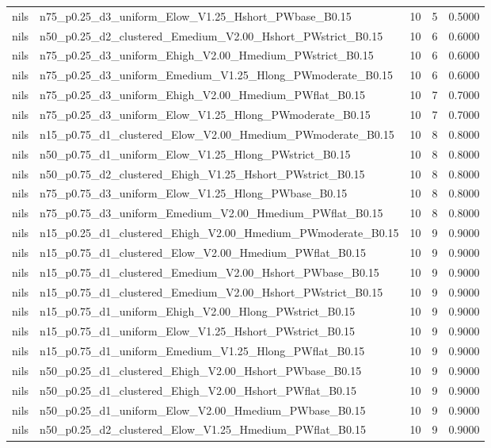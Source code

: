 \begin{tabular}{llrrr}
nils & n75_p0.25_d3_uniform_Elow_V1.25_Hshort_PWbase_B0.15 & 10 & 5 & 0.5000 \\
nils & n50_p0.25_d2_clustered_Emedium_V2.00_Hshort_PWstrict_B0.15 & 10 & 6 & 0.6000 \\
nils & n75_p0.25_d3_uniform_Ehigh_V2.00_Hmedium_PWstrict_B0.15 & 10 & 6 & 0.6000 \\
nils & n75_p0.25_d3_uniform_Emedium_V1.25_Hlong_PWmoderate_B0.15 & 10 & 6 & 0.6000 \\
nils & n75_p0.25_d3_uniform_Ehigh_V2.00_Hmedium_PWflat_B0.15 & 10 & 7 & 0.7000 \\
nils & n75_p0.25_d3_uniform_Elow_V1.25_Hlong_PWmoderate_B0.15 & 10 & 7 & 0.7000 \\
nils & n15_p0.75_d1_clustered_Elow_V2.00_Hmedium_PWmoderate_B0.15 & 10 & 8 & 0.8000 \\
nils & n50_p0.75_d1_uniform_Elow_V1.25_Hlong_PWstrict_B0.15 & 10 & 8 & 0.8000 \\
nils & n50_p0.75_d2_clustered_Ehigh_V1.25_Hshort_PWstrict_B0.15 & 10 & 8 & 0.8000 \\
nils & n75_p0.75_d3_uniform_Elow_V1.25_Hlong_PWbase_B0.15 & 10 & 8 & 0.8000 \\
nils & n75_p0.75_d3_uniform_Emedium_V2.00_Hmedium_PWflat_B0.15 & 10 & 8 & 0.8000 \\
nils & n15_p0.25_d1_clustered_Ehigh_V2.00_Hmedium_PWmoderate_B0.15 & 10 & 9 & 0.9000 \\
nils & n15_p0.75_d1_clustered_Elow_V2.00_Hmedium_PWflat_B0.15 & 10 & 9 & 0.9000 \\
nils & n15_p0.75_d1_clustered_Emedium_V2.00_Hshort_PWbase_B0.15 & 10 & 9 & 0.9000 \\
nils & n15_p0.75_d1_clustered_Emedium_V2.00_Hshort_PWstrict_B0.15 & 10 & 9 & 0.9000 \\
nils & n15_p0.75_d1_uniform_Ehigh_V2.00_Hlong_PWstrict_B0.15 & 10 & 9 & 0.9000 \\
nils & n15_p0.75_d1_uniform_Elow_V1.25_Hshort_PWstrict_B0.15 & 10 & 9 & 0.9000 \\
nils & n15_p0.75_d1_uniform_Emedium_V1.25_Hlong_PWflat_B0.15 & 10 & 9 & 0.9000 \\
nils & n50_p0.25_d1_clustered_Ehigh_V2.00_Hshort_PWbase_B0.15 & 10 & 9 & 0.9000 \\
nils & n50_p0.25_d1_clustered_Ehigh_V2.00_Hshort_PWflat_B0.15 & 10 & 9 & 0.9000 \\
nils & n50_p0.25_d1_uniform_Elow_V2.00_Hmedium_PWbase_B0.15 & 10 & 9 & 0.9000 \\
nils & n50_p0.25_d2_clustered_Elow_V1.25_Hmedium_PWflat_B0.15 & 10 & 9 & 0.9000 \\

\end{tabular}
